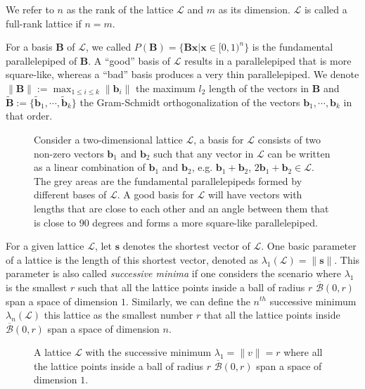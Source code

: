 \documentclass[cryptography,review,submit,pdftex,moreauthors,amsmath,amssymb,aps,strict]{Definitions/mdpi}
\begin{document}
We refer to $n$ as the rank of the lattice $\mathcal{L}$ and $m$ as its dimension. $\mathcal{L}$ is called a full-rank lattice if $n=m$.

For a basis $\mathbf{B}$ of $\mathcal{L}$, we called $P(\mathbf{B})=\{\mathbf{B}\mathbf{x}|\mathbf{x}\in[0,1)^n\}$ is the fundamental parallelepiped of $\mathbf{B}$. A ``good'' basis of $\mathcal{L}$ results in a parallelepiped that is more square-like, whereas a ``bad'' basis produces a very thin parallelepiped. We denote$\|\mathbf{B}\|:=\max_{1 \le i \le k} \|\mathbf{b}_i\|$ the maximum $l_2$ length of the vectors in $\mathbf{B}$ and $\tilde{\mathbf{B}}:=\{\tilde{\mathbf{b}}_1,\cdots,\tilde{\mathbf{b}}_k \}$ the Gram-Schmidt orthogonalization of the vectors $\mathbf{b}_1,\cdots,\mathbf{b}_k$ in that order.
\begin{figure}[!htb]
    \centering
        
    \caption{Consider a two-dimensional lattice $\mathcal{L}$, a basis for $\mathcal{L}$ consists of two non-zero vectors $\mathbf{b}_1$ and  $\mathbf{b}_2$ such that any vector in $\mathcal{L}$ can be written as a linear combination of $\mathbf{b}_1$ and $\mathbf{b}_2$, e.g. $\mathbf{b}_1+\mathbf{b}_2$, $2\mathbf{b}_1+\mathbf{b}_2\in \mathcal{L}$. The grey areas are the fundamental parallelepipeds formed by different bases of $\mathcal{L}$. A good basis for $\mathcal{L}$ will have vectors with lengths that are close to each other and an angle between them that is close to $90$ degrees and forms a more square-like parallelepiped.}
    \label{fig:lattice_basis}
\end{figure}

For a given lattice $\mathcal{L}$, let $\mathbf{s}$ denotes  the shortest vector of $\mathcal{L}$. One basic parameter of a lattice is the length of this shortest vector, denoted as $\lambda_1(\mathcal{L}) = \|\mathbf{s}\|$. This parameter is also called \textit{successive minima} if one considers the scenario where $\lambda_1$ is the smallest $r$ such that all the lattice points inside a ball of radius $r$ $\overline{\mathcal{B}}(0,r)$ span a space of dimension $1$. Similarly, we can define the $n^{th}$ successive minimum $\lambda_n(\mathcal{L})$ this lattice as the smallest number $r$ that all the lattice points inside $\overline{\mathcal{B}}(0,r)$ span a space of dimension $n$. 

\begin{figure}[!htb]
    \centering
    
    \caption{A lattice $\mathcal{L}$ with the successive minimum $\lambda_1=\|v\|=r$ where all the lattice points inside a ball of radius $r$ $\overline{\mathcal{B}}(0,r)$ span a space of dimension $1$.}
    \label{fig:lattice_sucessive_minimum}
\end{figure}
\end{document}
